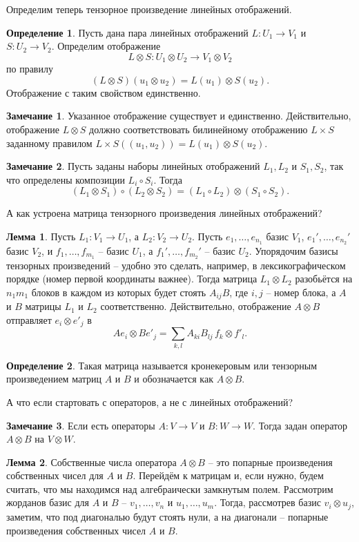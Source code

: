 \documentclass[12pt,a4paper,oneside]{book}
\theoremstyle{definition}
\newtheorem*{rem}{\color{green!50!blue}Замечание}
\newtheorem*{defn}{\color{yellow!30!red} Определение}
\newtheorem{lem}{\color{green!50!black}Лемма}
\def\dfn{\begin{defn}}
\def\edfn{\end{defn}}
\def\lm{\begin{lem}}
\def\elm{\end{lem}}
\def\rm{\begin{rem}}
\def\erm{\end{rem}}
\begin{document}
Определим теперь тензорное произведение линейных отображений.

\dfn Пусть дана пара линейных отображений $L \colon U_1 \to V_1$ и $S\colon U_2 \to V_2 $. Определим отображение $$L\otimes S \colon U_1\otimes U_2 \to V_1\otimes V_2$$ по  правилу $$(L \otimes S) (u_1\otimes  u_2) = L(u_1)\otimes S(u_2).$$
Отображение с таким свойством единственно.
\edfn

\rm Указанное отображение существует и единственно. Действительно,  отображение $L\otimes S$ должно соответствовать билинейному отображению $L\times S$ заданному правилом $L\times S ((u_1,u_2)) = L(u_1)\otimes S(u_2)$. 
\erm

\rm Пусть заданы наборы линейных отображений $L_1, L_2$ и $S_1, S_2$, так что определены композиции $L_i\circ S_i$. Тогда
$$(L_1\otimes S_1) \circ (L_2 \otimes S_2)=(L_1\circ L_2)\otimes (S_1\circ S_2).$$
\erm 

А как устроена матрица тензорного произведения линейных отображений?


\lm Пусть $L_1 \colon V_1 \to U_1$, а $L_2 \colon V_2 \to U_2$. Пусть $e_1,\dots, e_{n_1}$ базис $V_1$,  $e_1',\dots, e_{n_2}'$ базис $V_2$,  и $f_1,\dots, f_{m_1}$ -- базис $U_1$, а $f_1',\dots, f_{m_2}'$ -- базис $U_2$. 
Упорядочим базисы тензорных произведений -- удобно это сделать, например, в лексикографическом порядке (номер первой координаты важнее).
Тогда матрица  $L_1\otimes L_2$  разобьётся на $n_1m_1$ блоков в каждом из которых будет стоять $ A_{ij} B$, где $i,j$ -- номер блока, а $A$ и $B$ матрицы $L_1$ и $L_2$ соответственно.
\proof Действительно, отображение $A\otimes B$ отправляет $e_i\otimes e'_j$ в 
$$Ae_i \otimes Be'_j = \sum_{k,l} A_{ki}B_{lj} \, f_k\otimes f'_l.$$
\endproof
\elm

\dfn Такая матрица называется кронекеровым или тензорным произведением матриц $A$ и $B$ и обозначается как $A\otimes B$.
\edfn

А что если стартовать с операторов, а не с линейных отображений?

\rm Если есть операторы $A\colon V \to V$ и $B \colon W \to W$. Тогда задан оператор $A\otimes B$ на $V\otimes W$.
\erm

\lm Собственные числа оператора $A\otimes B$  -- это попарные произведения собственных чисел для $A$ и $B$. 
\proof Перейдём к матрицам и, если нужно, будем считать, что мы находимся над алгебраически замкнутым полем. Рассмотрим жорданов базис для $A$ и $B$ -- $v_1,\dots,v_n$ и $u_1,\dots, u_m$. Тогда, рассмотрев базис $v_i\otimes u_j$, заметим, что под диагональю будут стоять нули, а на диагонали -- попарные произведения собственных чисел $A$ и $B$.
\endproof
\elm
\end{document}
